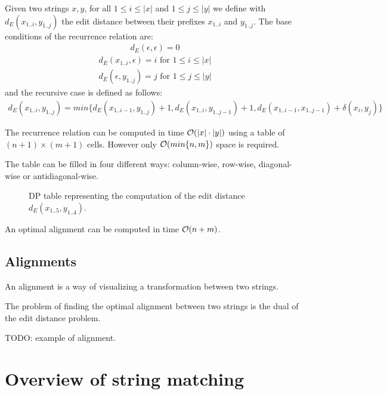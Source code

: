 Given two strings $x,y$, for all $1 \leq i \leq | x |$ and $1 \leq j \leq | y |$ we define with $d_E(x_{1..i},y_{1..j})$ the edit distance between their prefixes $x_{1..i}$ and $y_{1..j}$.
The base conditions of the recurrence relation are:
\begin{eqnarray}
d_E(\epsilon,\epsilon) = 0
\end{eqnarray}
\begin{eqnarray}
d_E(x_{1..i},\epsilon) = i \text{ for } 1 \leq i \leq | x |
\end{eqnarray}
\begin{eqnarray}
d_E(\epsilon, y_{1..j}) = j \text{ for } 1 \leq j \leq | y |
\end{eqnarray}
and the recursive case is defined as follows:
\begin{eqnarray}
d_E(x_{1..i},y_{1..j}) = min \{ d_E(x_{1..i-1},y_{1..j})+1, d_E(x_{1..i},y_{1..j-1})+1, d_E(x_{1..i-1},x_{1..j-1}) + \delta(x_i, y_j)\}
\end{eqnarray}

The recurrence relation can be computed in time $\mathcal{O}(| x | \cdot | y |)$ using a table of $(n+1) \times (m+1)$ cells. However only $\mathcal{O}(min\{ n, m \})$ space is required.

The table can be filled in four different ways: column-wise, row-wise, diagonal-wise or antidiagonal-wise.

\begin{figure}[h]
\caption{DP table representing the computation of the edit distance $d_E(x_{1..5}, y_{1..4})$.}
\label{fig:edit-dp}
\end{figure}

An optimal alignment can be computed in time $\mathcal{O}(n + m)$.

\subsection{Alignments}

An alignment is a way of visualizing a transformation between two strings.

The problem of finding the optimal alignment between two strings is the dual of the edit distance problem.

\begin{example}
TODO: example of alignment.
\end{example}


\section{Overview of string matching}

